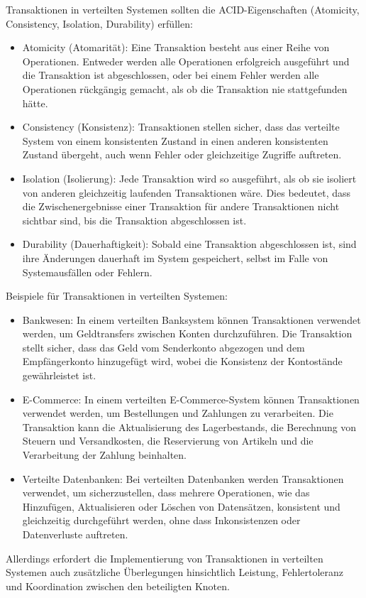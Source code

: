 Transaktionen in verteilten Systemen sollten die ACID-Eigenschaften (Atomicity, Consistency, Isolation, Durability) erfüllen:
\begin{itemize}
\item Atomicity (Atomarität): Eine Transaktion besteht aus einer Reihe von Operationen. Entweder werden alle Operationen erfolgreich ausgeführt und die Transaktion ist abgeschlossen, oder bei einem Fehler werden alle Operationen rückgängig gemacht, als ob die Transaktion nie stattgefunden hätte.
\item Consistency (Konsistenz): Transaktionen stellen sicher, dass das verteilte System von einem konsistenten Zustand in einen anderen konsistenten Zustand übergeht, auch wenn Fehler oder gleichzeitige Zugriffe auftreten.
\item Isolation (Isolierung): Jede Transaktion wird so ausgeführt, als ob sie isoliert von anderen gleichzeitig laufenden Transaktionen wäre. Dies bedeutet, dass die Zwischenergebnisse einer Transaktion für andere Transaktionen nicht sichtbar sind, bis die Transaktion abgeschlossen ist.
\item Durability (Dauerhaftigkeit): Sobald eine Transaktion abgeschlossen ist, sind ihre Änderungen dauerhaft im System gespeichert, selbst im Falle von Systemausfällen oder Fehlern.
\end{itemize}
Beispiele für Transaktionen in verteilten Systemen:
\begin{itemize}
\item Bankwesen: In einem verteilten Banksystem können Transaktionen verwendet werden, um Geldtransfers zwischen Konten durchzuführen. Die Transaktion stellt sicher, dass das Geld vom Senderkonto abgezogen und dem Empfängerkonto hinzugefügt wird, wobei die Konsistenz der Kontostände gewährleistet ist.
\item E-Commerce: In einem verteilten E-Commerce-System können Transaktionen verwendet werden, um Bestellungen und Zahlungen zu verarbeiten. Die Transaktion kann die Aktualisierung des Lagerbestands, die Berechnung von Steuern und Versandkosten, die Reservierung von Artikeln und die Verarbeitung der Zahlung beinhalten.
\item Verteilte Datenbanken: Bei verteilten Datenbanken werden Transaktionen verwendet, um sicherzustellen, dass mehrere Operationen, wie das Hinzufügen, Aktualisieren oder Löschen von Datensätzen, konsistent und gleichzeitig durchgeführt werden, ohne dass Inkonsistenzen oder Datenverluste auftreten.
\end{itemize}
Allerdings erfordert die Implementierung von Transaktionen in verteilten Systemen auch zusätzliche Überlegungen hinsichtlich Leistung, Fehlertoleranz und Koordination zwischen den beteiligten Knoten.
